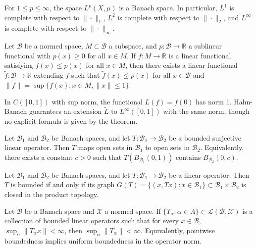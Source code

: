 \begin{example}
For $1 \leq p \leq \infty$, the space $L^p(X, \mu)$ is a Banach space. In particular, $L^1$ is complete with respect to $\|\cdot\|_1$, $L^2$ is complete with respect to $\|\cdot\|_2$, and $L^\infty$ is complete with respect to $\|\cdot\|_\infty$.
\end{example}

\begin{theorem}
Let $\mathcal{B}$ be a normed space, $M \subset \mathcal{B}$ a subspace, and $p: \mathcal{B} \to \mathbb{R}$ a sublinear functional with $p(x) \geq 0$ for all $x \in M$. If $f: M \to \mathbb{R}$ is a linear functional satisfying $f(x) \leq p(x)$ for all $x \in M$, then there exists a linear functional $\tilde{f}: \mathcal{B} \to \mathbb{R}$ extending $f$ such that $\tilde{f}(x) \leq p(x)$ for all $x \in \mathcal{B}$ and $\|\tilde{f}\| = \sup\{f(x) : x \in M, \|x\| \leq 1\}$.
\end{theorem}

\begin{example}
In $C([0,1])$ with sup norm, the functional $L(f) = f(0)$ has norm 1. Hahn-Banach guarantees an extension $\tilde{L}$ to $L^\infty([0,1])$ with the same norm, though no explicit formula is given by the theorem.
\end{example}

\begin{theorem}
Let $\mathcal{B}_1$ and $\mathcal{B}_2$ be Banach spaces, and let $T: \mathcal{B}_1 \to \mathcal{B}_2$ be a bounded surjective linear operator. Then $T$ maps open sets in $\mathcal{B}_1$ to open sets in $\mathcal{B}_2$. Equivalently, there exists a constant $c > 0$ such that $T(B_{\mathcal{B}_1}(0,1))$ contains $B_{\mathcal{B}_2}(0,c)$.
\end{theorem}

\begin{theorem}
Let $\mathcal{B}_1$ and $\mathcal{B}_2$ be Banach spaces, and let $T: \mathcal{B}_1 \to \mathcal{B}_2$ be a linear operator. Then $T$ is bounded if and only if its graph $G(T) = \{(x, Tx) : x \in \mathcal{B}_1\} \subset \mathcal{B}_1 \times \mathcal{B}_2$ is closed in the product topology.
\end{theorem}

\begin{theorem}
Let $\mathcal{B}$ be a Banach space and $\mathcal{X}$ a normed space. If $\{T_\alpha : \alpha \in A\} \subset \mathcal{L}(\mathcal{B}, \mathcal{X})$ is a collection of bounded linear operators such that for every $x \in \mathcal{B}$, $\sup_\alpha \|T_\alpha x\| < \infty$, then $\sup_\alpha \|T_\alpha\| < \infty$. Equivalently, pointwise boundedness implies uniform boundedness in the operator norm.
\end{theorem}

